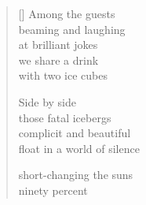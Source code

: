 \documentclass[12pt,a4paper]{article}
\begin{document}
\thispagestyle{empty}

\poemtitle{}

\settowidth{\versewidth}{float in a world of silence}

\bigskip

\begin{verse}[\versewidth]
  Among the guests \\
  beaming and laughing \\
  at brilliant jokes\\
  we share a drink\\
  with two ice cubes

  Side by side \\
  those fatal icebergs\\
  complicit and beautiful \\
  float in a world of silence

  short-changing the suns\\
  ninety percent
\end{verse}
\end{document}
